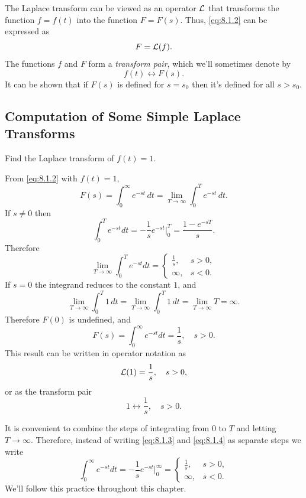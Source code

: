 \documentclass{ximera}
\begin{document}
The Laplace transform can be viewed as an operator ${\cal L}$ that
transforms the function $f=f(t)$  into the function $F=F(s)$. Thus,
\eqref{eq:8.1.2} can be expressed as
$$
F={\cal L}(f).
$$
The functions $f$ and $F$ form a \textit{transform pair}, which we'll
sometimes denote by
$$
f(t)\leftrightarrow F(s).
$$
It can be shown that if $F(s)$ is defined for $s=s_0$ then it's defined
for all $s>s_0$. %

\subsection*{Computation of Some Simple Laplace Transforms}

\begin{example}\label{example:8.1.1} 
 Find the Laplace transform of  $f(t)=1$.


\begin{explanation}
 From  \eqref{eq:8.1.2} with $f(t)=1$,
$$
F(s)=\int_0^\infty e^{-st}\,dt=\lim_{T\rightarrow\infty}\int_0^T e^{-st}\,
dt.
$$
If $s\neq 0$ then
\begin{equation}\label{eq:8.1.3}
\int_0^T e^{-st}dt=-\frac{1}{s}e^{-st}\Big|_0^T=\frac{1-e^{-sT}}{s}.
\end{equation}
Therefore
\begin{equation}\label{eq:8.1.4}
\lim_{T\rightarrow\infty}\int_0^T e^{-st}dt=\left\{\begin{array}{rr}
\frac{1}{s}, &   s>0,\\
\infty, &  s<0.
\end{array}\right.
\end{equation}
If $s=0$  the integrand reduces to the constant $1$, and
$$
\lim_{T\rightarrow\infty}\int_0^T 1\,dt=\lim_{T\rightarrow\infty}\int_0^T 1\,dt=
\lim_{T\rightarrow\infty}T=\infty.
$$
Therefore $F(0)$ is undefined, and
$$
F(s)=\int_0^\infty e^{-st}dt=\frac{1}{s},\quad s>0.
$$
This result can be written in operator notation as
$$
{\cal L}(1)=\frac{1}{s},\quad s>0,
$$
or as the transform pair
$$
1\leftrightarrow\frac{1}{s},\quad s>0.
$$
\end{explanation}
\end{example}
\begin{remark}
It is convenient to combine the steps of integrating from $0$ to $T$
and letting $T\rightarrow\infty$. Therefore, instead of writing \eqref{eq:8.1.3}
and \eqref{eq:8.1.4} as separate steps we write
$$
\int_0^\infty e^{-st}dt=-\frac{1}{s} e^{-st}\Big|_0^\infty=
\left\{\begin{array}{rr}\frac{1}{s}, & s>0,\\\infty,&s<
0.\end{array}\right.
$$
We'll follow this practice throughout this chapter.
\end{remark}
\end{document}
